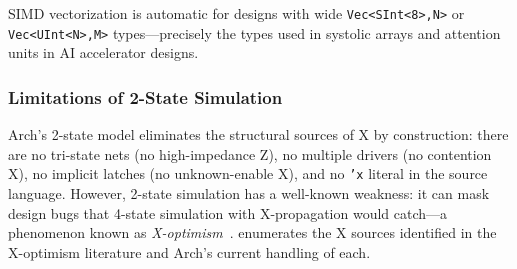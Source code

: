 \documentclass[11pt,twocolumn]{article}
\begin{document}
SIMD vectorization is automatic for designs with wide \texttt{Vec<SInt<8>,N>} or \texttt{Vec<UInt<N>,M>} types---precisely the types used in systolic arrays and attention units in AI accelerator designs.

\subsubsection{Limitations of 2-State Simulation}

Arch's 2-state model eliminates the structural sources of X by construction: there are no tri-state nets (no high-impedance Z), no multiple drivers (no contention X), no implicit latches (no unknown-enable X), and no \texttt{'x} literal in the source language. However, 2-state simulation has a well-known weakness: it can mask design bugs that 4-state simulation with X-propagation would catch---a phenomenon known as \emph{X-optimism}~\cite{zhao2014xoptimism}.  enumerates the X sources identified in the X-optimism literature and Arch's current handling of each.
\end{document}
